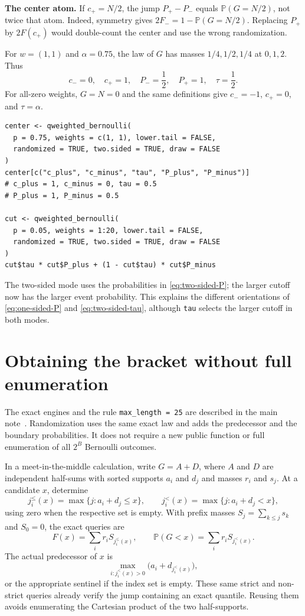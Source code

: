 \documentclass[11pt,letterpaper]{article}
\newcommand{\Pbb}{\mathbb P}
\begin{document}
\textbf{The center atom.} If $c_+=N/2$, the jump $P_+-P_-$ equals
$\Pbb(G=N/2)$, not twice that atom. Indeed, symmetry gives
$2F_-=1-\Pbb(G=N/2)$. Replacing $P_+$ by $2F(c_+)$ would double-count the
center and use the wrong randomization.

For $w=(1,1)$ and $\alpha=0.75$, the law of $G$ has masses $1/4,1/2,1/4$ at
$0,1,2$. Thus
\[
c_-=0,\quad c_+=1,\quad P_-=\frac12,\quad P_+=1,\quad\tau=\frac12.
\]
For all-zero weights, $G=N=0$ and the same definitions give $c_-=-1$,
$c_+=0$, and $\tau=\alpha$.

\begin{lstlisting}
center <- qweighted_bernoulli(
  p = 0.75, weights = c(1, 1), lower.tail = FALSE,
  randomized = TRUE, two.sided = TRUE, draw = FALSE
)
center[c("c_plus", "c_minus", "tau", "P_plus", "P_minus")]
# c_plus = 1, c_minus = 0, tau = 0.5
# P_plus = 1, P_minus = 0.5

cut <- qweighted_bernoulli(
  p = 0.05, weights = 1:20, lower.tail = FALSE,
  randomized = TRUE, two.sided = TRUE, draw = FALSE
)
cut$tau * cut$P_plus + (1 - cut$tau) * cut$P_minus
\end{lstlisting}
The two-sided mode uses the probabilities in \eqref{eq:two-sided-P}; the
larger cutoff now has the larger event probability. This explains the
different orientations of \eqref{eq:one-sided-P} and
\eqref{eq:two-sided-tau}, although \texttt{tau} selects the larger cutoff in
both modes.

\section{Obtaining the bracket without full enumeration}

The exact engines and the rule \texttt{max\_length = 25} are described in
the main note~\cite{mainnote}. Randomization uses the same exact law and adds
the predecessor and the boundary probabilities. It does not require a new
public function or full enumeration of all $2^B$ Bernoulli outcomes.

In a meet-in-the-middle calculation, write $G=A+D$, where $A$ and $D$ are
independent half-sums with sorted supports $a_i$ and $d_j$ and masses
$r_i$ and $s_j$. At a candidate $x$, determine
\[
j_i^{\le}(x)=\max\{j:a_i+d_j\le x\},\qquad
j_i^{<}(x)=\max\{j:a_i+d_j<x\},
\]
using zero when the respective set is empty. With prefix masses
$S_j=\sum_{k\le j}s_k$ and $S_0=0$, the exact queries are
\[
F(x)=\sum_i r_iS_{j_i^{\le}(x)},\qquad
\Pbb(G<x)=\sum_i r_iS_{j_i^{<}(x)}.
\]
The actual predecessor of $x$ is
\[
\max_{i:j_i^{<}(x)>0}\bigl(a_i+d_{j_i^{<}(x)}\bigr),
\]
or the appropriate sentinel if the index set is empty. These same strict
and non-strict queries already verify the jump containing an exact
quantile. Reusing them avoids enumerating the Cartesian product of the
two half-supports.
\end{document}
